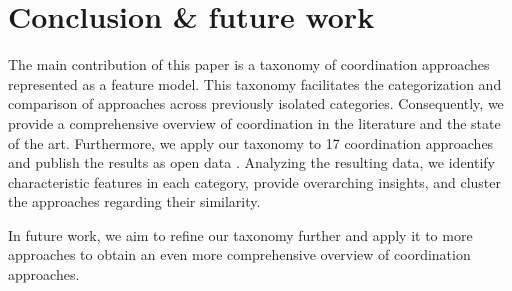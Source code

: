 \documentclass[runningheads]{llncs}
\begin{document}
\section{Conclusion \& future work} \label{sec: conclusion}

The main contribution of this paper is a taxonomy of coordination approaches represented as a feature model.
This taxonomy facilitates the categorization and comparison of approaches across previously isolated categories.
Consequently, we provide a comprehensive overview of coordination in the literature and the state of the art.
Furthermore, we apply our taxonomy to 17 coordination approaches and publish the results as open data \cite{timkrauterArtifactsCoordination2024}.
Analyzing the resulting data, we identify characteristic features in each category, provide overarching insights, and cluster the approaches regarding their similarity. 

In future work, we aim to refine our taxonomy further and apply it to more approaches to obtain an even more comprehensive overview of coordination approaches.



\end{document}
